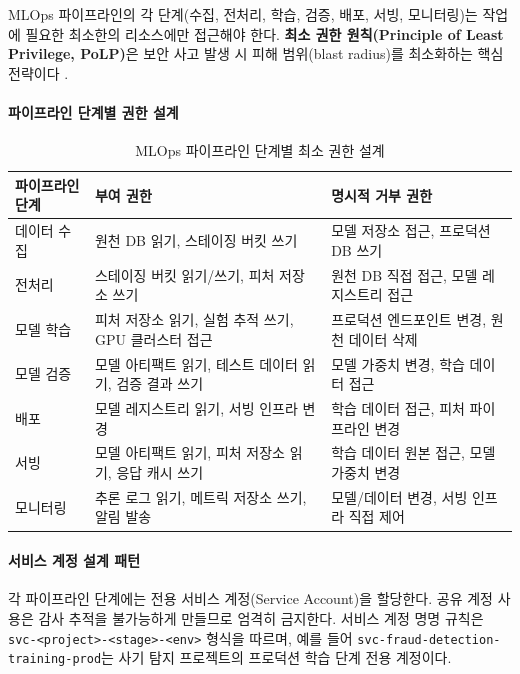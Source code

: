 MLOps 파이프라인의 각 단계(수집, 전처리, 학습, 검증, 배포, 서빙, 모니터링)는 작업에 필요한 최소한의 리소스에만 접근해야 한다. \textbf{최소 권한 원칙(Principle of Least Privilege, PoLP)}은 보안 사고 발생 시 피해 범위(blast radius)를 최소화하는 핵심 전략이다 \cite{amodei2016concrete}.

\paragraph{파이프라인 단계별 권한 설계}

\begin{table}[htbp]
\centering
\caption{MLOps 파이프라인 단계별 최소 권한 설계}
\label{tab:mlops_polp}
\begin{tabularx}{\textwidth}{p{2cm}p{4.5cm}X}
\toprule
\textbf{파이프라인 단계} & \textbf{부여 권한} & \textbf{명시적 거부 권한} \\
\midrule
데이터 수집 & 원천 DB 읽기, 스테이징 버킷 쓰기 & 모델 저장소 접근, 프로덕션 DB 쓰기 \\
전처리 & 스테이징 버킷 읽기/쓰기, 피처 저장소 쓰기 & 원천 DB 직접 접근, 모델 레지스트리 접근 \\
모델 학습 & 피처 저장소 읽기, 실험 추적 쓰기, GPU 클러스터 접근 & 프로덕션 엔드포인트 변경, 원천 데이터 삭제 \\
모델 검증 & 모델 아티팩트 읽기, 테스트 데이터 읽기, 검증 결과 쓰기 & 모델 가중치 변경, 학습 데이터 접근 \\
배포 & 모델 레지스트리 읽기, 서빙 인프라 변경 & 학습 데이터 접근, 피처 파이프라인 변경 \\
서빙 & 모델 아티팩트 읽기, 피처 저장소 읽기, 응답 캐시 쓰기 & 학습 데이터 원본 접근, 모델 가중치 변경 \\
모니터링 & 추론 로그 읽기, 메트릭 저장소 쓰기, 알림 발송 & 모델/데이터 변경, 서빙 인프라 직접 제어 \\
\bottomrule
\end{tabularx}
\end{table}

\paragraph{서비스 계정 설계 패턴}

각 파이프라인 단계에는 전용 서비스 계정(Service Account)을 할당한다. 공유 계정 사용은 감사 추적을 불가능하게 만들므로 엄격히 금지한다. 서비스 계정 명명 규칙은 \texttt{svc-<project>-<stage>-<env>} 형식을 따르며, 예를 들어 \texttt{svc-fraud-detection-training-prod}는 사기 탐지 프로젝트의 프로덕션 학습 단계 전용 계정이다.

